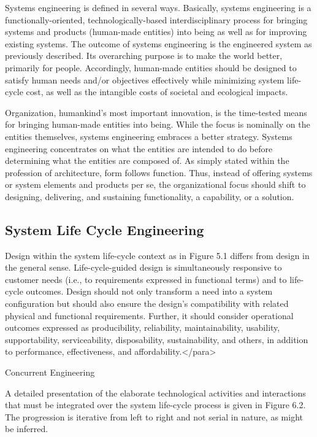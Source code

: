 Systems engineering is defined in several ways. Basically, systems engineering is a functionally-oriented, technologically-based interdisciplinary process for bringing systems and products (human-made entities) into being as well as for improving existing systems. The outcome of systems engineering is the engineered system as previously described. Its overarching purpose is to make the world better, primarily for people. Accordingly, human-made entities should be designed to satisfy human needs and/or objectives effectively while minimizing system life-cycle cost, as well as the intangible costs of societal and ecological impacts.

Organization, humankind’s most important innovation, is the time-tested means for bringing human-made entities into being. While the focus is nominally on the entities themselves, systems engineering embraces a better strategy. Systems engineering concentrates on what the entities are intended to do before determining what the entities are composed of. As simply stated within the profession of architecture, form follows function. Thus, instead of offering systems or system elements and products per se, the organizational focus should shift to designing, delivering, and sustaining functionality, a capability, or a solution.

\subsection{System Life Cycle Engineering}

Design within the system life-cycle context as in Figure 5.1 differs from design in the general sense. Life-cycle-guided design is simultaneously responsive to customer needs (i.e., to requirements expressed in functional terms) and to life-cycle outcomes. Design should not only transform a need into a system configuration but should also ensure the design’s compatibility with related physical and functional requirements. Further, it should consider operational outcomes expressed as producibility, reliability, maintainability, usability, supportability, serviceability, disposability, sustainability, and others, in addition to performance, effectiveness, and affordability.</para>

Concurrent Engineering

A detailed presentation of the elaborate technological activities and interactions that must be integrated over the system life-cycle process is given in Figure 6.2. The progression is iterative from left to right and not serial in nature, as might be inferred.


